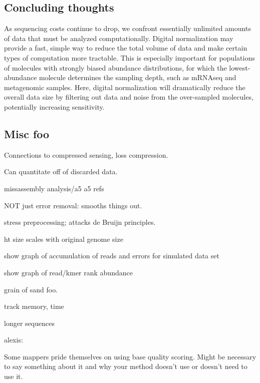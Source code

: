 \documentclass[10pt,draft]{article}
\begin{document}
\subsection*{Concluding thoughts}

As sequencing costs continue to drop, we confront essentially
unlimited amounts of data that must be analyzed computationally.
Digital normalization may provide a fast, simple way to reduce the
total volume of data and make certain types of computation more
tractable.  This is especially important for populations of molecules
with strongly biased abundance distributions, for which the
lowest-abundance molecule determines the sampling depth, such as
mRNAseq and metagenomic samples.  Here, digital normalization will
dramatically reduce the overall data size by filtering out data and
noise from the over-sampled molecules, potentially increasing
sensitivity.

\subsection*{Misc foo}

Connections to compressed sensing, loss compression.

Can quantitate off of discarded data.





missassembly analysis/a5
a5 refs

NOT just error removal: smooths things out.

stress preprocessing; attacks de Bruijn principles.

ht size scales with original genome size

show graph of accumulation of reads and errors for simulated data set

show graph of read/kmer rank abundance

grain of sand foo.


track memory, time

longer sequences

alexis:

Some mappers pride themselves on using base quality scoring.  Might be
necessary to say something about it and why your method doesn't use or
doesn't need to use it.
\end{document}
